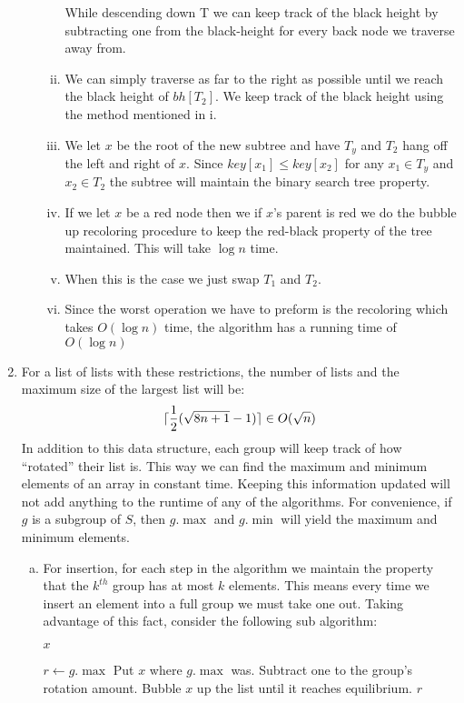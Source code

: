 \documentclass[letterpaper,10pt]{article}
\DeclarePairedDelimiter{\ceil}{\lceil}{\rceil}
\begin{document}
\begin{enumerate}
\begin{enumerate}[a)]
\begin{enumerate}[i.]
			While descending down T we can keep track of the black height by subtracting one from the black-height for every back node we traverse away from. 
			\item We can simply traverse as far to the right as possible until we reach the black height of $bh[T_2]$. We keep track of the black height using the method mentioned in i.
			\item We let $x$ be the root of the new subtree and have $T_y$ and $T_2$ hang off the left and right of $x$. Since $key[x_1] \leq key[x_2]$ for any $x_1 \in T_y$ and $x_2 \in T_2$ the subtree will maintain the binary search tree property.
			\item If we let $x$ be a red node then we if $x$'s parent is red we do the bubble up recoloring procedure to keep the red-black property of the tree maintained. This will take $\log n$ time.
			\item When this is the case we just swap $T_1$ and $T_2$.
			\item Since the worst operation we have to preform is the recoloring which takes $O(\log n)$ time, the algorithm has a running time of $O(\log n)$
		\end{enumerate}
	\end{enumerate}
	\clearpage
	\item 
		For a list of lists with these restrictions, the number of lists and the maximum size of the largest list will be:
		$$ \ceil{ \frac{1}{2} (\sqrt{8n + 1} - 1)} \in O(\sqrt{n}) $$
		In addition to this data structure, each group will keep track of how ``rotated'' their list is. This way we can find the maximum and minimum elements of an array in constant time. Keeping this information updated will not add anything to the runtime of any of the algorithms. For convenience, if $g$ is a subgroup of $S$, then $g.\max$ and $g.\min$ will yield the maximum and minimum elements.

	\begin{enumerate}[a)]
		\item For insertion, for each step in the algorithm we maintain the property that the $k^{th}$ group has at most $k$ elements. This means every time we insert an element into a full group we must take one out. Taking advantage of this fact, consider the following sub algorithm:

		\begin{algorithmic}
				\State \Return $x$
			\EndIf

			\State $r \gets g.\max$
			\State Put $x$ where $g.\max$ was.
			\State Subtract one to the group's rotation amount.
			\State Bubble $x$ up the list until it reaches equilibrium.
			\State \Return $r$


\end{algorithmic}
\end{enumerate}
\end{enumerate}
\end{document}

